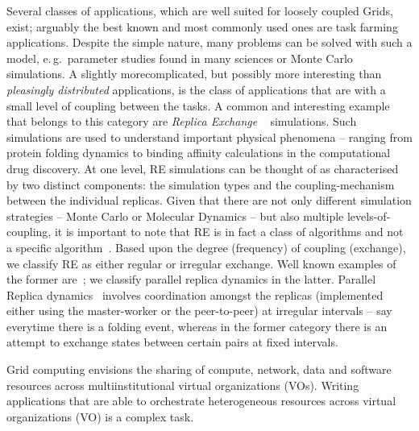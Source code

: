 \documentclass[times, 10pt,twocolumn]{article}
\begin{document}
\begin{abstract}
\end{abstract}



                           
Several classes of applications, which are well suited for loosely
coupled Grids, exist; arguably the best known and most commonly used
ones are task farming applications. Despite the simple nature, many
problems can be solved with such a model, e.\,g.\ parameter studies
found in many sciences or Monte Carlo simulations. A slightly
morecomplicated, but possibly more interesting than {\it pleasingly
  distributed} applications, is the class of applications that are
with a small level of coupling between the tasks.  
A common and interesting example that belongs to this category are
\emph{Replica Exchange }~\cite{hansmann,Sugita:1999rm} simulations.
Such simulations are used to understand important physical phenomena
-- ranging from protein folding dynamics to binding affinity
calculations in the computational drug discovery.  At one level, RE
simulations can be thought of as characterised by two distinct
components: the simulation types and the coupling-mechanism between
the individual replicas. Given that there are not only different
simulation strategies -- Monte Carlo or Molecular Dynamics -- but also
multiple levels-of-coupling, it is important to note that RE is in
fact a class of algorithms and not a specific
algorithm~\cite{dpa_surveypaper}.  Based upon the degree (frequency)
of coupling (exchange), we classify RE as either regular or irregular
exchange. Well known examples of the former
are~\cite{hansmann,Sugita:1999rm}; we classify parallel replica
dynamics in the latter. Parallel Replica dynamics~\cite{SPdynamics,
  pande_bj03} involves coordination amongst the replicas (implemented
either using the master-worker or the peer-to-peer) at irregular
intervals -- say everytime there is a folding event, whereas in the
former category there is an attempt to exchange states between certain
pairs at fixed intervals.

Grid computing envisions the sharing of compute, network, data and
software resources across multiinstitutional virtual organizations
(VOs). Writing applications that are able to orchestrate heterogeneous
resources across virtual organizations (VO) is a complex task.
\end{document}

